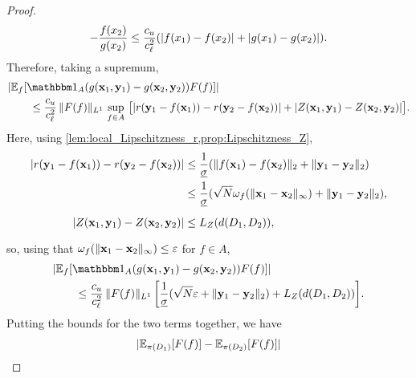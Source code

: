 \documentclass[12pt, twoside]{report}
\begin{document}
\begin{proof}
\begin{equation}
{            -
            \frac{f(x_2)}{g(x_2)}
        }
        \le \frac{c_u}{c_\ell^2}\parens*{
            \abs{f(x_1) - f(x_2)}
            + \abs{g(x_1) - g(x_2)}
        }.
    \end{equation}
    Therefore, taking a supremum,
    \begin{align}
        &\abs{\E_f\sbrac{
            \ind_A\parens{
                g(\vx_1, \vy_1)
                - g(\vx_2, \vy_2)
            }
            F(f)
        }} \\
        &\qquad\le 
            \frac{c_u}{c_\ell^2}
            \,
            \norm{F(f)}_{L^1}
            \,
            \sup_{f \in A}
            \,\big[
                \abs{
                    r(\vy_1 - f(\vx_1))
                    - r(\vy_2 - f(\vx_2))
                }
                + \abs{Z(\vx_1, \vy_1) - Z(\vx_2, \vy_2)}
            \big]. \nonumber
    \end{align}
    Here, using \cref{lem:local_Lipschitzness_r,prop:Lipschitzness_Z},
    \begin{align}
        \abs{
            r(\vy_1 - f(\vx_1))
            - r(\vy_2 - f(\vx_2))
        }
        &\le \frac{1}{\underline{\sigma}}(
            \norm{f(\vx_1) - f(\vx_2)}_2
            + \norm{\vy_1 - \vy_2}_2
        ) \\
        &\le \frac{1}{\underline{\sigma}}(
            \sqrt{N}\omega_f(\norm{\vx_1 - \vx_2}_\infty)
            + \norm{\vy_1 - \vy_2}_2
        ), \\
        \abs{Z(\vx_1, \vy_1) - Z(\vx_2, \vy_2)}
        &\le \vphantom{\frac{1}{}} L_Z(d(D_1, D_2)),
    \end{align}
    so, using that $\omega_f(\lVert\mathbf{x}_1 - \mathbf{x}_2\rVert_\infty) \le \varepsilon$ for $f \in A$,
    \begin{align}
        &\abs{\E_f\sbrac{
            \ind_A\parens{
                g(\vx_1, \vy_1)
                - g(\vx_2, \vy_2)
            }
            F(f)
        }} \nonumber \\
        &\qquad
            \le 
            \frac{c_u}{c_\ell^2}
            \,\norm{F(f)}_{L^1}
            \,\sbrac*{
                \frac{1}{\underline{\sigma}}(
                    \sqrt{N}\e
                    + \norm{\vy_1 - \vy_2}_2
                )
                + L_Z(d(D_1, D_2))
            }.
    \end{align}
    Putting the bounds for the two terms together, we have
    \begin{align}
        &\abs{\E_{\pi(D_1)}[F(f)] - \E_{\pi(D_2)}[F(f)]} \nonumber \\

\end{align}
\end{proof}
\end{document}
